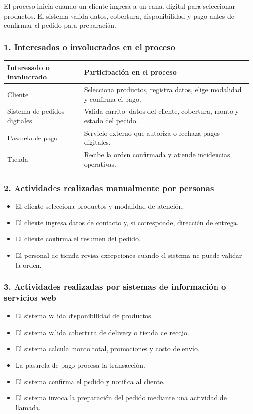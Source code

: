 \documentclass[a4paper,12pt]{article}
\begin{document}
El proceso inicia cuando un cliente ingresa a un canal digital para seleccionar productos. El sistema valida datos, cobertura, disponibilidad y pago antes de confirmar el pedido para preparación.

\subsubsection*{1. Interesados o involucrados en el proceso}

\begin{longtable}{P{5cm} P{9cm}}
\toprule
\textbf{Interesado o involucrado} & \textbf{Participación en el proceso} \\
\midrule
Cliente & Selecciona productos, registra datos, elige modalidad y confirma el pago. \\
Sistema de pedidos digitales & Valida carrito, datos del cliente, cobertura, monto y estado del pedido. \\
Pasarela de pago & Servicio externo que autoriza o rechaza pagos digitales. \\
Tienda & Recibe la orden confirmada y atiende incidencias operativas. \\
\bottomrule
\end{longtable}

\subsubsection*{2. Actividades realizadas manualmente por personas}

\begin{itemize}
    \item El cliente selecciona productos y modalidad de atención.
    \item El cliente ingresa datos de contacto y, si corresponde, dirección de entrega.
    \item El cliente confirma el resumen del pedido.
    \item El personal de tienda revisa excepciones cuando el sistema no puede validar la orden.
\end{itemize}

\subsubsection*{3. Actividades realizadas por sistemas de información o servicios web}

\begin{itemize}
    \item El sistema valida disponibilidad de productos.
    \item El sistema valida cobertura de delivery o tienda de recojo.
    \item El sistema calcula monto total, promociones y costo de envío.
    \item La pasarela de pago procesa la transacción.
    \item El sistema confirma el pedido y notifica al cliente.
    \item El sistema invoca la preparación del pedido mediante una actividad de llamada.
\end{itemize}
\end{document}
